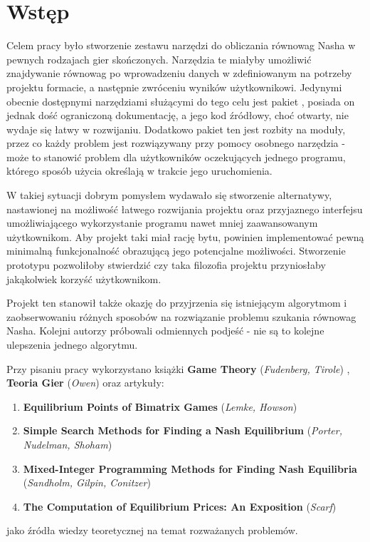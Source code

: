 \documentclass[polish]{standalone}
\begin{document}
\pagestyle{headings}

\section*{Wstęp}

Celem pracy było stworzenie zestawu narzędzi do obliczania równowag Nasha w pewnych rodzajach gier skończonych.
Narzędzia te miałyby umożliwić znajdywanie równowag po wprowadzeniu danych w zdefiniowanym na potrzeby projektu
formacie, a następnie zwróceniu wyników użytkownikowi. Jedynymi obecnie dostępnymi narzędziami służącymi do tego celu
jest pakiet , posiada on jednak dość ograniczoną dokumentację, a jego kod źródłowy, choć otwarty, nie
wydaje się łatwy w rozwijaniu. Dodatkowo pakiet ten jest rozbity na moduły, przez co każdy problem jest rozwiązywany
przy pomocy osobnego narzędzia - może to stanowić problem dla użytkowników oczekujących jednego programu, którego
sposób użycia określają w trakcie jego uruchomienia.

W takiej sytuacji dobrym pomysłem wydawało się stworzenie alternatywy, nastawionej na możliwość łatwego rozwijania
projektu oraz przyjaznego interfejsu umożliwiającego wykorzystanie programu nawet mniej zaawansowanym użytkownikom. Aby
projekt taki miał rację bytu, powinien implementować pewną minimalną funkcjonalność obrazującą jego potencjalne
możliwości. Stworzenie prototypu pozwoliłoby stwierdzić czy taka filozofia projektu przyniosłaby jakąkolwiek korzyść
użytkownikom.

Projekt ten stanowił także okazję do przyjrzenia się istniejącym algorytmom i zaobserwowaniu różnych sposobów na
rozwiązanie problemu szukania równowag Nasha. Kolejni autorzy próbowali odmiennych podjeść - nie są to kolejne
ulepszenia jednego algorytmu.

Przy pisaniu pracy wykorzystano książki \textbf{Game Theory} (\textit{Fudenberg, Tirole}) \cite{FT-GT},
\textbf{Teoria Gier} (\textit{Owen}) \cite{O-GT} oraz artykuły:
\begin{enumerate}
\item \textbf{Equilibrium Points of Bimatrix Games} (\textit{Lemke, Howson})
\cite{LH-NE}
\item \textbf{Simple Search Methods for Finding a Nash Equilibrium} (\textit{Porter, Nudelman, Shoham})
\cite{PNS-NE}
\item \textbf{Mixed-Integer Programming Methods for Finding Nash Equilibria} (\textit{Sandholm, Gilpin, Conitzer})
\cite{SCG-NE}
\item \textbf{The Computation of Equilibrium Prices: An Exposition} (\textit{Scarf})
\cite{SCARF-NR}
\end{enumerate}
jako źródła wiedzy teoretycznej na temat rozważanych problemów.
\end{document}
